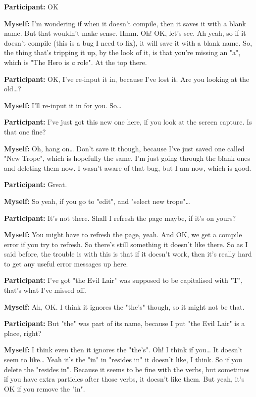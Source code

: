\documentclass[11pt]{report}
\begin{document}
\begin{linenumbers}
\textbf{Participant:} OK

\textbf{Myself:} I'm wondering if when it doesn't compile, then it saves it with a blank name. But that wouldn't make sense. Hmm. Oh! OK, let's see. Ah yeah, so if it doesn't compile (this is a bug I need to fix), it will save it with a blank name. So, the thing that's tripping it up, by the look of it, is that you're missing an "a", which is "The Hero is \emph{a} role". At the top there.

\textbf{Participant:} OK, I've re-input it in, because I've lost it. Are you looking at the old\ldots{}?

\textbf{Myself:} I'll re-input it in for you. So\ldots{}

\textbf{Participant:} I've just got this new one here, if you look at the screen capture. Is that one fine?

\textbf{Myself:} Oh, hang on\ldots{} Don't save it though, because I've just saved one called "New Trope", which is hopefully the same. I'm just going through the blank ones and deleting them now. I wasn't aware of that bug, but I am now, which is good.

\textbf{Participant:} Great.

\textbf{Myself:} So yeah, if you go to "edit", and "select new trope"\ldots{}

\textbf{Participant:} It's not there. Shall I refresh the page maybe, if it's on yours?

\textbf{Myself:} You might have to refresh the page, yeah. And OK, we get a compile error if you try to refresh. So there's still something it doesn't like there. So as I said before, the trouble is with this is that if it doesn't work, then it's really hard to get any useful error messages up here.

\textbf{Participant:} I've got "the Evil Lair" was supposed to be capitalised
with "T", that's what I've missed off.

\textbf{Myself:} Ah, OK. I think it ignores the "the's" though, so it might not be that.

\textbf{Participant:} But "the" was part of its name, because I put "the Evil Lair" is a place, right?

\textbf{Myself:} I think even then it ignores the "the's". Oh! I think if you\ldots{} It doesn't seem to like\ldots{} Yeah it's the "in" in "resides in" it doesn't like, I think. So if you delete the "resides in". Because it seems to be fine with the verbs, but sometimes if you have extra particles after those verbs, it doesn't like them. But yeah, it's OK if you remove the "in".


\end{linenumbers}
\end{document}
